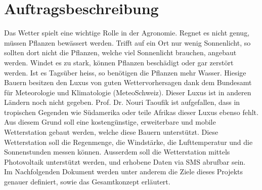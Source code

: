 \section{Auftragsbeschreibung}
Das Wetter spielt eine wichtige Rolle in der Agronomie. Regnet es nicht genug, müssen Pflanzen bewässert werden. Trifft auf ein Ort nur wenig Sonnenlicht, so sollten dort nicht die Pflanzen, welche viel Sonnenlicht brauchen, angebaut werden. Windet es zu stark, können Pflanzen beschädigt oder gar zerstört werden. Ist es Tagsüber heiss, so benötigen die Pflanzen mehr Wasser. Hiesige Bauern besitzen den Luxus von guten Wettervorhersagen dank dem Bundesamt für Meteorologie und Klimatologie (MeteoSchweiz). Dieser Luxus ist in anderen Ländern noch nicht gegeben. Prof. Dr. Nouri Taoufik ist aufgefallen, dass in tropischen Gegenden wie Südamerika oder teile Afrikas dieser Luxus ebenso fehlt. \\[0.5cm]
Aus diesem Grund soll eine kostengünstige, erweiterbare und mobile Wetterstation gebaut werden, welche diese Bauern unterstützt. Diese Wetterstation soll die Regenmenge, die Windstärke, die Lufttemperatur und die Sonnenstunden messen können. Ausserdem soll die Wetterstation mittels Photovoltaik unterstützt werden, und erhobene Daten via SMS abrufbar sein. \\[0.5cm]
Im Nachfolgenden Dokument werden unter anderem die Ziele dieses Projekts genauer definiert, sowie das Gesamtkonzept erläutert.